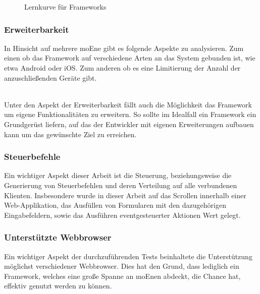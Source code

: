 \begin{figure}[H]
	\centering
	\vspace{-25pt}
	\caption[Darstellung der Lernkurve für \Gls{Framework}s]{Lernkurve für \Gls{Framework}s}
\end{figure}
\vspace{-40pt}


	\pagebreak
	 \subsubsection{Erweiterbarkeit}
	 In Hinsicht auf mehrere \Gls{moEn}e gibt es folgende Aspekte zu analysieren. Zum einen ob das \Gls{Framework} auf verschiedene Arten an das System gebunden ist, wie etwa Android oder iOS. Zum anderen ob es eine Limitierung der Anzahl der 				anzuschließenden Geräte gibt. 

	\\Unter den Aspekt der Erweiterbarkeit fällt auch die Möglichkeit das \Gls{Framework} um eigene Funktionalitäten zu erweitern. So sollte im Idealfall ein \Gls{Framework} ein Grundgerüst liefern, auf das der Entwickler mit eigenen Erweiterungen aufbauen kann um 	das gewünschte Ziel zu erreichen.
	
	\subsubsection{Steuerbefehle}
	Ein wichtiger Aspekt dieser Arbeit ist die Steuerung, beziehungsweise die Generierung von Steuerbefehlen und deren Verteilung auf alle verbundenen Klienten. Insbesondere wurde in dieser Arbeit auf das Scrollen innerhalb einer \mbox{Web-Applikation}, das Ausfüllen von Formularen mit den dazugehörigen Eingabefeldern, sowie das Ausführen eventgesteuerter Aktionen Wert gelegt.

	\subsubsection{Unterstützte \Gls{Webbrowser}}
	Ein wichtiger Aspekt der durchzuführenden Tests beinhaltete die Unterstützung möglichst verschiedener \Gls{Webbrowser}. Dies hat den Grund, dass lediglich ein \Gls{Framework}, welches eine große Spanne an \Gls{moEn}en abdeckt, die Chance hat, effektiv genutzt werden zu können.


